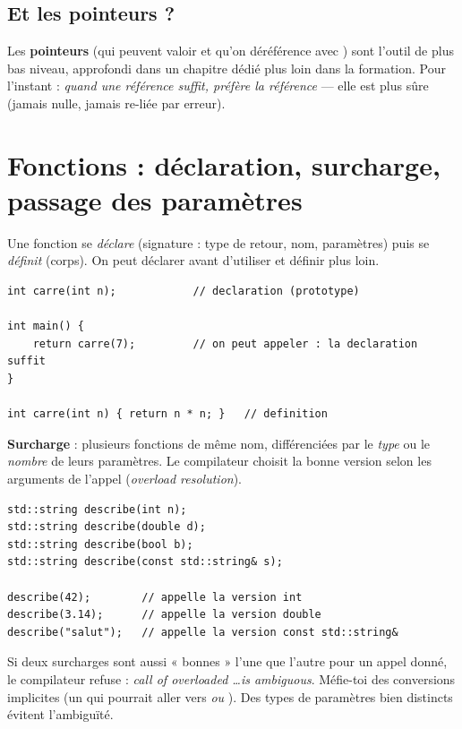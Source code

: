 \documentclass[11pt]{article}
\begin{document}
\subsection*{Et les pointeurs ?}

Les \textbf{pointeurs}  (qui peuvent valoir  et qu'on
déréférence avec \code{*}) sont l'outil de plus bas niveau, approfondi dans un
chapitre dédié plus loin dans la formation. Pour l'instant : \emph{quand une
référence suffit, préfère la référence} — elle est plus sûre (jamais nulle,
jamais re-liée par erreur).

\section{Fonctions : déclaration, surcharge, passage des paramètres}

Une fonction se \emph{déclare} (signature : type de retour, nom, paramètres)
puis se \emph{définit} (corps). On peut déclarer avant d'utiliser et définir
plus loin.

\begin{lstlisting}
int carre(int n);            // declaration (prototype)

int main() {
    return carre(7);         // on peut appeler : la declaration suffit
}

int carre(int n) { return n * n; }   // definition
\end{lstlisting}

\textbf{Surcharge} : plusieurs fonctions de même nom, différenciées par le
\emph{type} ou le \emph{nombre} de leurs paramètres. Le compilateur choisit la
bonne version selon les arguments de l'appel (\emph{overload resolution}).

\begin{lstlisting}
std::string describe(int n);
std::string describe(double d);
std::string describe(bool b);
std::string describe(const std::string& s);

describe(42);        // appelle la version int
describe(3.14);      // appelle la version double
describe("salut");   // appelle la version const std::string&
\end{lstlisting}

\begin{piege}
Si deux surcharges sont aussi « bonnes » l'une que l'autre pour un appel donné,
le compilateur refuse : \emph{call of overloaded \ldots is ambiguous}. Méfie-toi
des conversions implicites (un  qui pourrait aller vers 
\emph{ou} ). Des types de paramètres bien distincts évitent
l'ambiguïté.
\end{piege}
\end{document}
